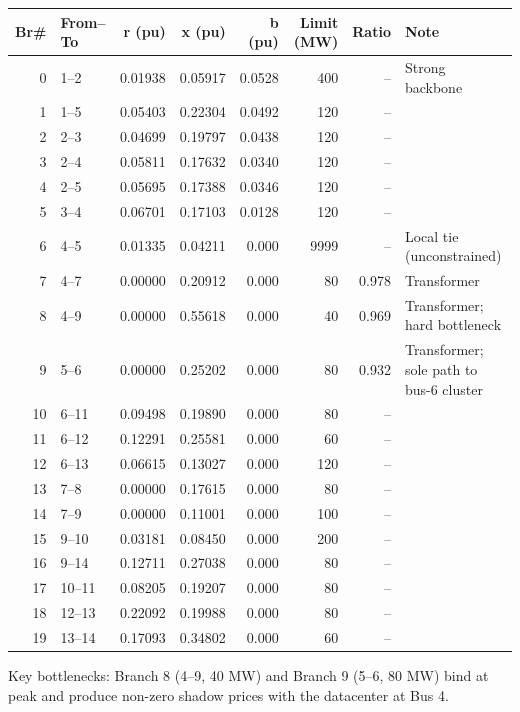 \documentclass[11pt]{article}
\begin{document}
\begin{center}
\small
\begin{tabular}{rlrrrrrl}
\toprule
Br\# & From--To & r (pu) & x (pu) & b (pu) & Limit (MW) & Ratio & Note \\
\midrule
0  & 1--2  & 0.01938 & 0.05917 & 0.0528 & 400  & --    & Strong backbone \\
1  & 1--5  & 0.05403 & 0.22304 & 0.0492 & 120  & --    & \\
2  & 2--3  & 0.04699 & 0.19797 & 0.0438 & 120  & --    & \\
3  & 2--4  & 0.05811 & 0.17632 & 0.0340 & 120  & --    & \\
4  & 2--5  & 0.05695 & 0.17388 & 0.0346 & 120  & --    & \\
5  & 3--4  & 0.06701 & 0.17103 & 0.0128 & 120  & --    & \\
6  & 4--5  & 0.01335 & 0.04211 & 0.000  & 9999 & --    & Local tie (unconstrained) \\
7  & 4--7  & 0.00000 & 0.20912 & 0.000  & 80   & 0.978 & Transformer \\
8  & 4--9  & 0.00000 & 0.55618 & 0.000  & 40   & 0.969 & Transformer; hard bottleneck \\
9  & 5--6  & 0.00000 & 0.25202 & 0.000  & 80   & 0.932 & Transformer; sole path to bus-6 cluster \\
10 & 6--11 & 0.09498 & 0.19890 & 0.000  & 80   & --    & \\
11 & 6--12 & 0.12291 & 0.25581 & 0.000  & 60   & --    & \\
12 & 6--13 & 0.06615 & 0.13027 & 0.000  & 120  & --    & \\
13 & 7--8  & 0.00000 & 0.17615 & 0.000  & 80   & --    & \\
14 & 7--9  & 0.00000 & 0.11001 & 0.000  & 100  & --    & \\
15 & 9--10 & 0.03181 & 0.08450 & 0.000  & 200  & --    & \\
16 & 9--14 & 0.12711 & 0.27038 & 0.000  & 80   & --    & \\
17 & 10--11& 0.08205 & 0.19207 & 0.000  & 80   & --    & \\
18 & 12--13& 0.22092 & 0.19988 & 0.000  & 80   & --    & \\
19 & 13--14& 0.17093 & 0.34802 & 0.000  & 60   & --    & \\
\bottomrule
\end{tabular}
\end{center}

\noindent Key bottlenecks: Branch 8 (4--9, 40 MW) and Branch 9 (5--6, 80 MW) bind at peak and produce non-zero shadow prices with the datacenter at Bus 4.
\end{document}

